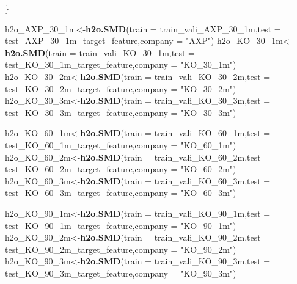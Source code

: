 \documentclass[]{DissertateUSU}
\newenvironment{Shaded}{\begin{snugshade}}{\end{snugshade}}
\newcommand{\DataTypeTok}[1]{\textcolor[rgb]{0.13,0.29,0.53}{#1}}
\newcommand{\DecValTok}[1]{\textcolor[rgb]{0.00,0.00,0.81}{#1}}
\newcommand{\KeywordTok}[1]{\textcolor[rgb]{0.13,0.29,0.53}{\textbf{#1}}}
\newcommand{\NormalTok}[1]{#1}
\newcommand{\StringTok}[1]{\textcolor[rgb]{0.31,0.60,0.02}{#1}}
\begin{document}
\begin{Shaded}
\begin{Highlighting}[]
{{\NormalTok{\}}


\NormalTok{h2o_AXP_}\DecValTok{30}\NormalTok{_1m<-}\KeywordTok{h2o.SMD}\NormalTok{(}\DataTypeTok{train =}\NormalTok{ train_vali_AXP_}\DecValTok{30}\NormalTok{_1m,}\DataTypeTok{test =}\NormalTok{ test_AXP_}\DecValTok{30}\NormalTok{_1m_target_feature,}\DataTypeTok{company =} \StringTok{"AXP"}\NormalTok{)}
\NormalTok{h2o_KO_}\DecValTok{30}\NormalTok{_1m<-}\KeywordTok{h2o.SMD}\NormalTok{(}\DataTypeTok{train =}\NormalTok{ train_vali_KO_}\DecValTok{30}\NormalTok{_1m,}\DataTypeTok{test =}\NormalTok{ test_KO_}\DecValTok{30}\NormalTok{_1m_target_feature,}\DataTypeTok{company =} \StringTok{"KO_30_1m"}\NormalTok{)}
\NormalTok{h2o_KO_}\DecValTok{30}\NormalTok{_2m<-}\KeywordTok{h2o.SMD}\NormalTok{(}\DataTypeTok{train =}\NormalTok{ train_vali_KO_}\DecValTok{30}\NormalTok{_2m,}\DataTypeTok{test =}\NormalTok{ test_KO_}\DecValTok{30}\NormalTok{_2m_target_feature,}\DataTypeTok{company =} \StringTok{"KO_30_2m"}\NormalTok{)}
\NormalTok{h2o_KO_}\DecValTok{30}\NormalTok{_3m<-}\KeywordTok{h2o.SMD}\NormalTok{(}\DataTypeTok{train =}\NormalTok{ train_vali_KO_}\DecValTok{30}\NormalTok{_3m,}\DataTypeTok{test =}\NormalTok{ test_KO_}\DecValTok{30}\NormalTok{_3m_target_feature,}\DataTypeTok{company =} \StringTok{"KO_30_3m"}\NormalTok{)}

\NormalTok{h2o_KO_}\DecValTok{60}\NormalTok{_1m<-}\KeywordTok{h2o.SMD}\NormalTok{(}\DataTypeTok{train =}\NormalTok{ train_vali_KO_}\DecValTok{60}\NormalTok{_1m,}\DataTypeTok{test =}\NormalTok{ test_KO_}\DecValTok{60}\NormalTok{_1m_target_feature,}\DataTypeTok{company =} \StringTok{"KO_60_1m"}\NormalTok{)}
\NormalTok{h2o_KO_}\DecValTok{60}\NormalTok{_2m<-}\KeywordTok{h2o.SMD}\NormalTok{(}\DataTypeTok{train =}\NormalTok{ train_vali_KO_}\DecValTok{60}\NormalTok{_2m,}\DataTypeTok{test =}\NormalTok{ test_KO_}\DecValTok{60}\NormalTok{_2m_target_feature,}\DataTypeTok{company =} \StringTok{"KO_60_2m"}\NormalTok{)}
\NormalTok{h2o_KO_}\DecValTok{60}\NormalTok{_3m<-}\KeywordTok{h2o.SMD}\NormalTok{(}\DataTypeTok{train =}\NormalTok{ train_vali_KO_}\DecValTok{60}\NormalTok{_3m,}\DataTypeTok{test =}\NormalTok{ test_KO_}\DecValTok{60}\NormalTok{_3m_target_feature,}\DataTypeTok{company =} \StringTok{"KO_60_3m"}\NormalTok{)}

\NormalTok{h2o_KO_}\DecValTok{90}\NormalTok{_1m<-}\KeywordTok{h2o.SMD}\NormalTok{(}\DataTypeTok{train =}\NormalTok{ train_vali_KO_}\DecValTok{90}\NormalTok{_1m,}\DataTypeTok{test =}\NormalTok{ test_KO_}\DecValTok{90}\NormalTok{_1m_target_feature,}\DataTypeTok{company =} \StringTok{"KO_90_1m"}\NormalTok{)}
\NormalTok{h2o_KO_}\DecValTok{90}\NormalTok{_2m<-}\KeywordTok{h2o.SMD}\NormalTok{(}\DataTypeTok{train =}\NormalTok{ train_vali_KO_}\DecValTok{90}\NormalTok{_2m,}\DataTypeTok{test =}\NormalTok{ test_KO_}\DecValTok{90}\NormalTok{_2m_target_feature,}\DataTypeTok{company =} \StringTok{"KO_90_2m"}\NormalTok{)}
\NormalTok{h2o_KO_}\DecValTok{90}\NormalTok{_3m<-}\KeywordTok{h2o.SMD}\NormalTok{(}\DataTypeTok{train =}\NormalTok{ train_vali_KO_}\DecValTok{90}\NormalTok{_3m,}\DataTypeTok{test =}\NormalTok{ test_KO_}\DecValTok{90}\NormalTok{_3m_target_feature,}\DataTypeTok{company =} \StringTok{"KO_90_3m"}\NormalTok{)}

}}
\end{Highlighting}
\end{Shaded}
\end{document}
